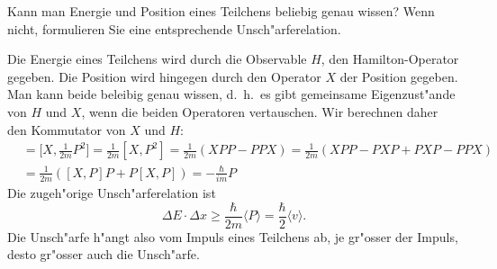 Kann man Energie und Position eines Teilchens beliebig genau wissen?
Wenn nicht, formulieren Sie eine entsprechende Unsch"arferelation.

\begin{loesung}
Die Energie eines Teilchens wird durch die Observable $H$, den
Hamilton-Operator gegeben.
Die Position wird hingegen durch den Operator $X$ der Position
gegeben.
Man kann beide beleibig genau wissen, d.~h.~es gibt gemeinsame
Eigenzust"ande von $H$ und $X$, wenn die beiden Operatoren vertauschen.
Wir berechnen daher den Kommutator von $X$ und $H$:
\begin{align*}
[X,H]
&=
\biggl[X,\frac1{2m}P^2\biggr]
=
\frac1{2m}[X,P^2]
=
\frac1{2m}(XPP-PPX)
=
\frac1{2m}(XPP-PXP+PXP-PPX)
\\
&=
\frac1{2m}([X,P]P+P[X,P])
=
-\frac{\hbar}{im} P
\end{align*}
Die zugeh"orige Unsch"arferelation ist
\[
\Delta E\cdot \Delta x\ge \frac{\hbar}{2m}\langle P\rangle
=
\frac{\hbar}{2}\langle v\rangle.
\]
Die Unsch"arfe h"angt also vom Impuls eines Teilchens ab, je gr"osser
der Impuls, desto gr"osser auch die Unsch"arfe.
\end{loesung}

